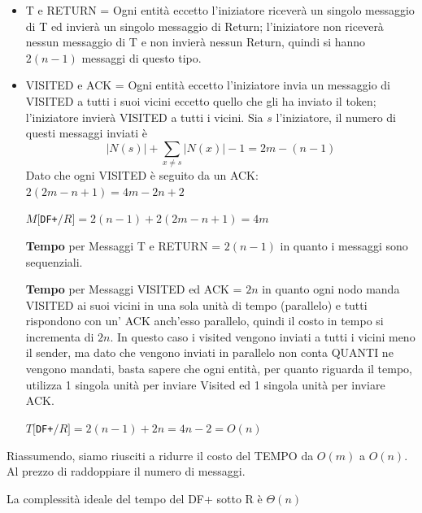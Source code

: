 \begin{itemize}
    \item T e RETURN = Ogni entità eccetto l'iniziatore riceverà un singolo
          messaggio di T ed invierà un singolo messaggio di Return; l'iniziatore non
          riceverà nessun messaggio di T e non invierà nessun Return, quindi si hanno
          $2(n-1)$ messaggi di questo tipo.

    \item VISITED e ACK = Ogni entità eccetto l'iniziatore invia un messaggio di
          VISITED a tutti i suoi vicini eccetto quello che gli ha inviato il token;
          l'iniziatore invierà VISITED a tutti i vicini. Sia $s$ l'iniziatore, il numero
          di questi messaggi inviati è
          $$|N(s)| + \sum_{x \neq s} |N(x)| - 1 = 2m - (n - 1)$$ Dato che ogni
          VISITED è seguito da un ACK: $2(2m - n + 1) = 4m -2n + 2$

          \begin{center}
              $M[$\texttt{DF+}$/R] = 2(n-1) + 2(2m-n+1) = 4m$
          \end{center}

          \textbf{Tempo} per Messaggi T e RETURN = $2(n-1)$ in quanto i messaggi
          sono sequenziali.

          \textbf{Tempo} per Messaggi VISITED ed ACK = $2n$ in quanto ogni nodo
          manda VISITED ai suoi vicini in una sola unità di tempo (parallelo) e
          tutti rispondono con un' ACK anch'esso parallelo, quindi il costo in
          tempo si incrementa di $2n$. In questo caso i visited vengono inviati a
          tutti i vicini meno il sender, ma dato che vengono inviati in parallelo
          non conta QUANTI ne vengono mandati, basta sapere che ogni entità, per
          quanto riguarda il tempo, utilizza 1 singola unità per inviare Visited
          ed 1 singola unità per inviare ACK.

          \begin{center}
              $T[$\texttt{DF+}$/R] = 2(n-1) + 2n = 4n - 2 = O(n)$\\
          \end{center}
\end{itemize}

Riassumendo, siamo riusciti a ridurre il costo del TEMPO da $O(m)$ a $O(n)$. Al
prezzo di raddoppiare il numero di messaggi.

\begin{prop}
    La complessità ideale del tempo del DF+ sotto R è $\Theta(n)$
\end{prop}

